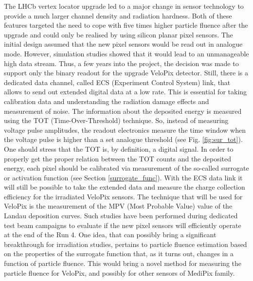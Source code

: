 The LHCb vertex locator upgrade led to a major change in sensor technology to provide a much larger channel density and radiation hardness. Both of these features targeted the need to cope with five times higher particle fluence after the upgrade and could only be realised by using silicon planar pixel sensors. The initial design assumed that the new pixel sensors would be read out in analogue mode. However, simulation studies showed that it would lead to an unmanageable high data stream. Thus, a few years into the project, the decision was made to support only the binary readout for the upgrade VeloPix detector. Still, there is a dedicated data channel, called ECS (Experiment Control System) link, that allows to send out extended digital data at a low rate. This is essential for taking calibration data and understanding the radiation damage effects and measurement of noise. The information about the deposited energy is measured using the TOT\cite{Esposito:2011} (Time-Over-Threshold) technique. So, instead of measuring voltage pulse amplitudes, the readout electronics measure the time window when the voltage pulse is higher than a set analogue threshold (see Fig. \ref{fig:sur_tot}). One should stress that the TOT is, by definition, a digital signal. In order to properly get the proper relation between the TOT counts and the deposited energy, each pixel should be calibrated via measurement of the so-called surrogate or activation function (see Section \ref{surrogate_func}).
With the ECS data link it will still be possible to take the extended data and measure the charge collection efficiency for the irradiated VeloPix sensors. The technique that will be used for VeloPix is the measurement of the MPV (Most Probable Value) value of the Landau deposition curves. Such studies have been performed during dedicated test beam campaigns to evaluate if the new pixel sensors will efficiently operate at the end of the Run 4. One idea, that can possibly bring a significant breakthrough for irradiation studies, pertains to particle fluence estimation based on the properties of the surrogate function that, as it turns out, changes in a function of particle fluence.
This would bring a novel method for measuring the particle fluence for VeloPix, and possibly for other sensors of MediPix family.

